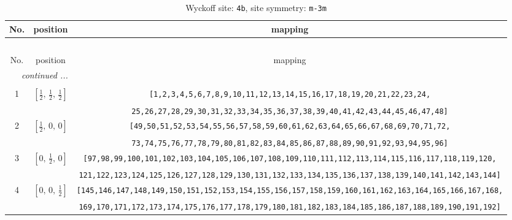 \documentclass[fleqn,8pt]{jsarticle}
\begin{document}
\begin{longtable}{ccc}
\caption{Wyckoff site: {\tt 4b}, site symmetry: {\tt m-3m}}
 \\
 \hline \hline
No. & position & mapping \\ \hline \endfirsthead

\multicolumn{2}{l}{\tablename\ \thetable{}} \\
 \hline \hline
No. & position & mapping \\ \hline \endhead

 \hline \hline
\multicolumn{2}{r}{\footnotesize\it continued ...} \\ \endfoot

 \hline \hline
\multicolumn{2}{r}{} \\ \endlastfoot

1 & $\left[ \frac{1}{2},\, \frac{1}{2},\, \frac{1}{2} \right]$ & {\tt [1,2,3,4,5,6,7,8,9,10,11,12,13,14,15,16,17,18,19,20,21,22,23,24,} \\ \hline
 &  & {\tt 25,26,27,28,29,30,31,32,33,34,35,36,37,38,39,40,41,42,43,44,45,46,47,48]} \\ \hline
2 & $\left[ \frac{1}{2},\, 0,\, 0 \right]$ & {\tt [49,50,51,52,53,54,55,56,57,58,59,60,61,62,63,64,65,66,67,68,69,70,71,72,} \\ \hline
 &  & {\tt 73,74,75,76,77,78,79,80,81,82,83,84,85,86,87,88,89,90,91,92,93,94,95,96]} \\ \hline
3 & $\left[ 0,\, \frac{1}{2},\, 0 \right]$ & {\tt [97,98,99,100,101,102,103,104,105,106,107,108,109,110,111,112,113,114,115,116,117,118,119,120,} \\ \hline
 &  & {\tt 121,122,123,124,125,126,127,128,129,130,131,132,133,134,135,136,137,138,139,140,141,142,143,144]} \\ \hline
4 & $\left[ 0,\, 0,\, \frac{1}{2} \right]$ & {\tt [145,146,147,148,149,150,151,152,153,154,155,156,157,158,159,160,161,162,163,164,165,166,167,168,} \\ \hline
 &  & {\tt 169,170,171,172,173,174,175,176,177,178,179,180,181,182,183,184,185,186,187,188,189,190,191,192]} \\
\end{longtable}
\renewcommand{\arraystretch}{1.2}
\end{document}
